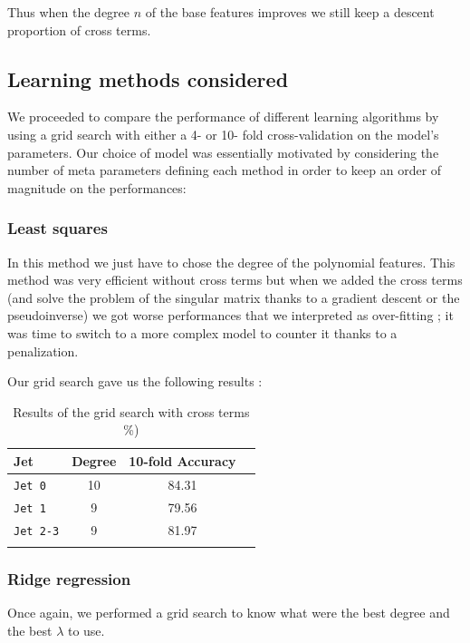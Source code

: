\documentclass[10pt,conference,compsocconf]{IEEEtran}
\begin{document}
Thus when the degree $n$ of the base features improves we still keep a descent proportion of cross terms.

\subsection{Learning methods considered}

We proceeded to compare the performance of different learning algorithms by using a grid search with either a 4- or 10- fold cross-validation on the model's parameters. Our choice of model was essentially motivated by considering the number of meta parameters defining each method in order to keep an order of magnitude on the performances: 

\subsubsection{Least squares}

In this method we just have to chose the degree of the polynomial features. This method was very efficient without cross terms but when we added the cross terms (and solve the problem of the singular matrix thanks to a gradient descent or the pseudoinverse) we got worse performances that we interpreted as over-fitting ; it was time to switch to a more complex model to counter it thanks to a penalization.

Our grid search gave us the following results : 

\begin{table}[h!]
\centering
\caption{Results of the grid search with cross terms \%)}
\footnotesize
\hspace{-0.2cm}
\begin{tabular}{ l| ccc } 
 \hline
   Jet & Degree & 10-fold Accuracy  \\
 \hline
   \verb+Jet 0+  & 10 &  84.31 \\
   \verb+Jet 1+  & 9 & 79.56 \\
   \verb+Jet 2-3+  & 9 & 81.97 \\
  \hline
\label{grid_search_ridge_cross}
\end{tabular}
\end{table}


\subsubsection{Ridge regression}

Once again, we performed a grid search to know what were the best degree and the best $\lambda$ to use.
\end{document}
